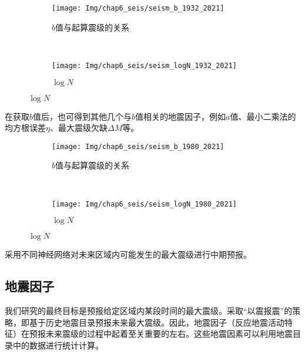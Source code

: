 \begin{figure}[!htbp]
  \centering
  \begin{subfigure}[b]{1.0\textwidth}
    \caption{$b$值与起算震级的关系} 
    \texttt{[image: Img/chap6\_seis/seism\_b\_1932\_2021]}
    \label{fig:seism_b_m_1932_2021}
  \end{subfigure}   
  ~
  \begin{subfigure}[b]{1.0\textwidth}
      \caption{$\log N$}
      \texttt{[image: Img/chap6\_seis/seism\_logN\_1932\_2021]}
      \label{fig:seism_logn_m_1932_2021}
  \end{subfigure}
  \label{fig:seism_mc_1932_2021}
\end{figure}

在获取$b$值后，也可得到其他几个与$b$值相关的地震因子，例如$a$值、最小二乘法的均方根误差$\eta$、最大震级欠缺$\Delta M$等。




\begin{figure}[!htbp]
\centering
\begin{subfigure}[b]{1.0\textwidth}
    \caption{$b$值与起算震级的关系} 
    \texttt{[image: Img/chap6\_seis/seism\_b\_1980\_2021]}
    \label{fig:seism_b_m_1980_2021}
\end{subfigure}   
~
\begin{subfigure}[b]{1.0\textwidth}
    \caption{$\log N$}
    \texttt{[image: Img/chap6\_seis/seism\_logN\_1980\_2021]}
    \label{fig:seism_logn_m_1980_2021}
\end{subfigure}
\label{fig:seism_mc_1980_2021}
\end{figure}


采用不同神经网络对未来区域内可能发生的最大震级进行中期预报。
\subsection{地震因子}\label{sec:seism_indicator}

我们研究的最终目标是预报给定区域内某段时间的最大震级。采取``以震报震''的策略，即基于历史地震目录预报未来最大震级。因此，地震因子（反应地震活动特征）在预报未来震级的过程中起着至关重要的左右。这些地震因素可以利用地震目录中的数据进行统计计算。

